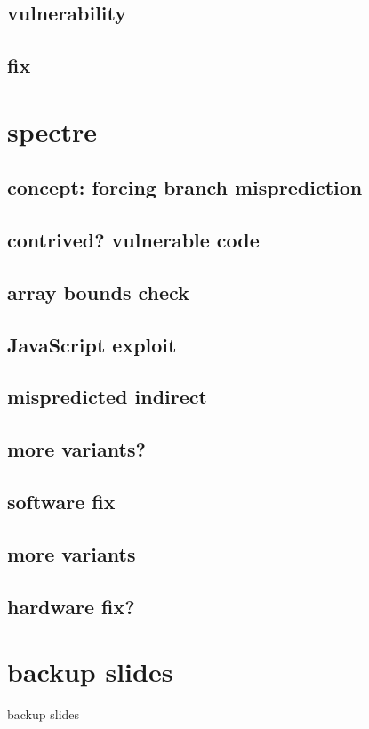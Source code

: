 \subsection{vulnerability}


\subsection{fix}


\section{spectre}

\subsection{concept: forcing branch misprediction}


\subsection{contrived? vulnerable code}


\subsection{array bounds check}


\subsection{JavaScript exploit}


\subsection{mispredicted indirect}


\subsection{more variants?}


\subsection{software fix}


\subsection{more variants}

\subsection{hardware fix?}

\section{backup slides}
\begin{frame}{backup slides}
\end{frame}



